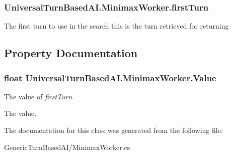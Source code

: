 \subsubsection[{first\+Turn}]{ Universal\+Turn\+Based\+A\+I.\+Minimax\+Worker.\+first\+Turn}\label{class_universal_turn_based_a_i_1_1_minimax_worker_ac4ce50aa90e42a8702e5ad783a35f05b}


The first turn to use in the search this is the turn retrieved for returning 



\subsection{Property Documentation}
\hypertarget{class_universal_turn_based_a_i_1_1_minimax_worker_aba59322c19f8226090dfaf8d7b5d8737}{}
\subsubsection[{Value}]{\setlength{\rightskip}{0pt plus 5cm}float Universal\+Turn\+Based\+A\+I.\+Minimax\+Worker.\+Value\hspace{0.3cm}{\ttfamily [get]}}\label{class_universal_turn_based_a_i_1_1_minimax_worker_aba59322c19f8226090dfaf8d7b5d8737}


The value of {\itshape first\+Turn}  

The value.

The documentation for this class was generated from the following file\+:\begin{DoxyCompactItemize}
\item 
Generic\+Turn\+Based\+A\+I/Minimax\+Worker.\+cs\end{DoxyCompactItemize}
